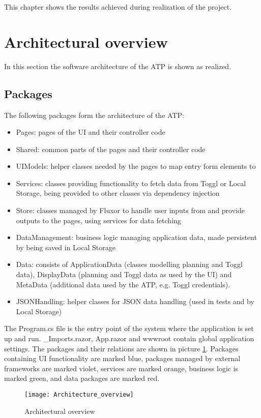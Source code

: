 
This chapter shows the results achieved during realization of the project.

\section{Architectural overview} \label{Architecture}
In this section the software architecture of the ATP is shown as realized.

\subsection{Packages}
The following packages form the architecture of the ATP:
\begin{itemize}
	\item Pages: pages of the UI and their controller code
	\item Shared: common parts of the pages and their controller code
	\item UIModels: helper classes needed by the pages to map entry form elements to
	\item Services: classes providing functionality to fetch data from Toggl or Local Storage, being provided to other classes via dependency injection
	\item Store: classes managed by Fluxor to handle user inputs from and provide outputs to the pages, using services for data fetching
	\item DataManagement: business logic managing application data, made persistent by being saved in Local Storage
	\item Data: consists of ApplicationData (classes modelling planning and Toggl data), DisplayData (planning and Toggl data as used by the UI) and MetaData (additional data used by the ATP, e.g. Toggl credentials).
	\item JSONHandling: helper classes for JSON data handling (used in tests and by Local Storage)
\end{itemize}
The Program.cs file is the entry point of the system where the application is set up and run. \_Imports.razor, App.razor and wwwroot contain global application settings. The packages and their relations are shown in picture \ref{architecture_overview}. Packages containing UI functionality are marked blue, packages managed by external frameworks are marked violet, services are marked orange, business logic is marked green, and data packages are marked red.
\begin{figure}[H]
	\centering
	\texttt{[image: Architecture\_overview]}
	\caption{Architectural overview}
	\label{architecture_overview}
\end{figure}

